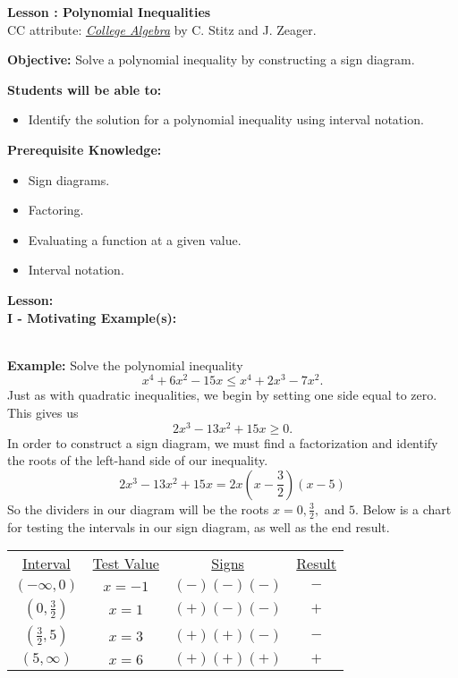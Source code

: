 \documentclass[12pt]{article}
\theoremstyle{definition}
\begin{document}
{\bf \large Lesson : Polynomial Inequalities}\label{les:polynomial_inequalities}
\\ CC attribute: \href{http://www.stitz-zeager.com}{\it{College Algebra}} by C. Stitz and J. Zeager. 
\hfill \doclicenseImage[imagewidth=5em]\\
\par
{\bf Objective:}	Solve a polynomial inequality by constructing a sign diagram.\\
\par
{\bf Students will be able to:}
\begin{itemize}
	\item Identify the solution for a polynomial inequality using interval notation.
\end{itemize}
{\bf Prerequisite Knowledge:}
\begin{itemize}
	\item Sign diagrams.
	\item Factoring.
	\item Evaluating a function at a given value.
	\item Interval notation.
\end{itemize}
\hrulefill

{\bf Lesson:}\\
{\bf I - Motivating Example(s):}\\
\ \par
{\bf Example:}  Solve the polynomial inequality
$$x^4+6x^2-15x\leq x^4+2x^3-7x^2.$$
Just as with quadratic inequalities, we begin by setting one side equal to zero.  This gives us $$2x^3-13x^2+15x\geq 0.$$
In order to construct a sign diagram, we must find a factorization and identify the roots of the left-hand side of our inequality.
$$2x^3-13x^2+15x=2x\left(x-\dfrac{3}{2}\right)(x-5)$$
So the dividers in our diagram will be the roots $x=0,\frac{3}{2},$ and $5$.  Below is a chart for testing the intervals in our sign diagram, as well as the end result.

\begin{center}
\begin{tabular}{cccc}
\underline{Interval} & \underline{Test Value} & \underline{Signs} & \underline{Result}\\
$(-\infty,0)$ & $x=-1$ & $(-)(-)(-)$ & $-$\\
$(0,\frac{3}{2})$ & $x=1$ & $(+)(-)(-)$ & $+$\\
$(\frac{3}{2},5)$ & $x=3$ & $(+)(+)(-)$ & $-$\\
$(5,\infty)$ &  $x=6$ & $(+)(+)(+)$ & $+$
\end{tabular}
\end{center}
\end{document}
